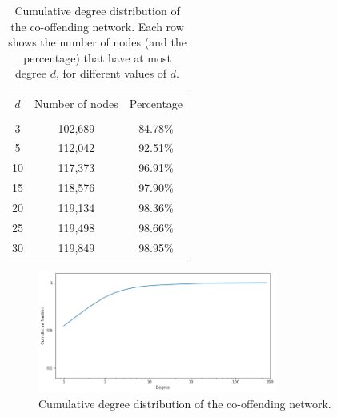 \documentclass[11pt, english]{article}
\begin{document}
\begin{multicols}{2}
\begin{table}
	\caption{Cumulative degree distribution of the co-offending network. Each row shows the number of nodes (and the percentage) that have at most degree $d$, for different values of $d$.}
	\label{tab:cumulative-degree-distribution}
	\centering
	\begin{tabular}{ccc}
		\hline\hline
		\\[-1.5ex]
		$d$		&	Number of nodes	&	Percentage	\\[0.5ex]\hline
		\\[-1.5ex]
		3		&	102,689			&	84.78\%		\\[0.2ex]
		5		&	112,042			&	92.51\%		\\[0.2ex]
		10		&	117,373			&	96.91\%		\\[0.2ex]
		15		&	118,576			&	97.90\%		\\[0.2ex]
		20		&	119,134			&	98.36\%		\\[0.2ex]
		25		&	119,498			&	98.66\%		\\[0.2ex]
		30		&	119,849			&	98.95\%		\\[0.5ex]
		\hline\hline
	\end{tabular}
\end{table}

\begin{figure}
	\caption{Cumulative degree distribution of the co-offending network.}
	\centering
	\label{fig:cumulative-degree-distribution}
	\includegraphics[width=0.7\textwidth]{cumulative-degree-distribution}
\end{figure}


\end{multicols}
\end{document}
